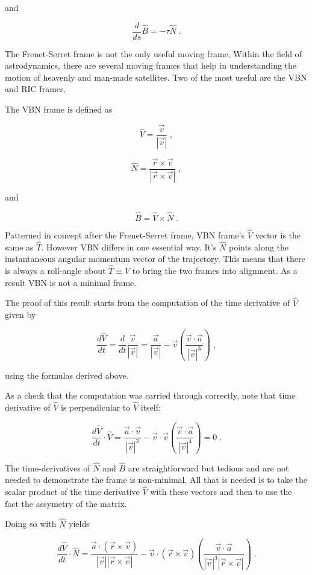\documentclass[10pt]{article}
\begin{document}
and

\[ \frac{d}{d s} \hat B = -\tau \hat N \; .\]

The Frenet-Serret frame is not the only useful moving frame.  Within the field of astrodynamics, there are several moving frames that help in understanding the motion of heavenly and man-made satellites.  Two of the most useful are the VBN and RIC frames.  

The VBN frame is defined as

\[ \hat V = \frac{\vec v}{|\vec v|} \; ,\]

\[ \hat N = \frac{ \vec r \times \vec v }{ | \vec r \times \vec v | } \;, \]

and

\[ \hat B = \hat V \times \hat N \; .\]

Patterned in concept after the Frenet-Serret frame, VBN frame's $\hat V$ vector is the same as $\hat T$.  However VBN differs in one essential way.  It's $\hat N$ points along the instantaneous angular momentum vector of the trajectory.  This means that there is always a roll-angle about $\hat T \equiv \hat V$ to bring the two frames into alignment.  As a result VBN is not a minimal frame.  

The proof of this result starts from the computation of the time derivative of $\hat V$ given by

\[ \frac{d \hat V}{dt}  = \frac{d}{dt} \frac{\vec v}{|\vec v|} = \frac{\vec a}{|\vec v|} - \vec v \left( \frac{\vec v \cdot \vec a}{|\vec v|^3} \right) \; ,\]

using the formulas derived above.

As a check that the computation was carried through correctly, note that time derivative of $\hat V$ is perpendicular to $\hat V$ itself:

\[ \frac{d \hat V}{dt} \cdot \hat V = \frac{\vec a \cdot \vec v}{|\vec v|^2} - \vec v \cdot \vec v \left( \frac{\vec v \cdot \vec a}{|\vec v|^4} \right) = 0 \; .\]

The time-derivatives of $\hat N$ and $\hat B$ are straightforward but tedious and are not needed to demonstrate the frame is non-minimal.  All that is needed is to take the scalar product of the time derivative $\hat V$ with these vectors and then to use the fact the assymetry of the matrix.  

Doing so with $\hat N$ yields

\[ \frac{d \hat V}{dt} \cdot \hat N = \frac{\vec a \cdot (\vec r \times \vec v) }{|\vec v||\vec r \times \vec v|} - \vec v \cdot (\vec r \times \vec v) \left( \frac{\vec v \cdot \vec a}{|\vec v|^3 |\vec r \times \vec v|} \right) \; . \]
\end{document}
